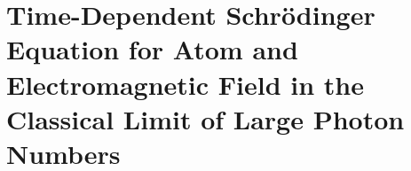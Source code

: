 \chapter[TDSE from Semi-classical Environment]{Time-Dependent Schrödinger Equation 
for Atom and Electromagnetic Field in the Classical Limit of Large Photon Numbers\label{chap:briggs_rost_semiclassic}}

